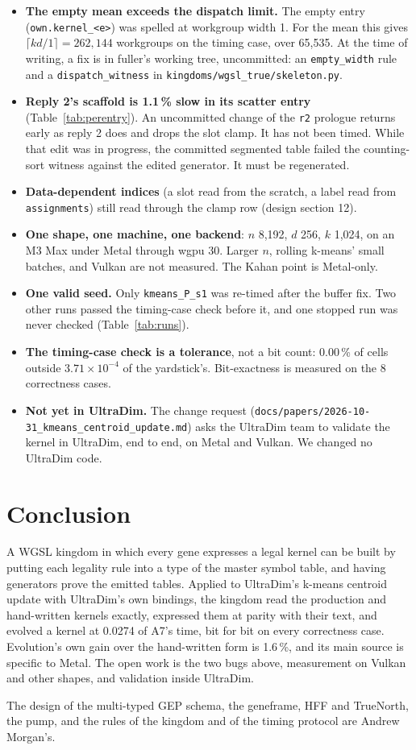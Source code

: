 \documentclass[sigconf,nonacm]{acmart}
\newcommand{\code}[1]{\nolinkurl{#1}}
\newcommand{\src}[1]{{\footnotesize\nolinkurl{#1}}}
\begin{document}
\begin{itemize}
\item \textbf{The empty mean exceeds the dispatch limit.} The empty entry
  (\code{own.kernel_<e>}) was spelled at workgroup width 1. For the mean this
  gives $\lceil kd/1\rceil=262{,}144$ workgroups on the timing case, over
  65,535. At the time of writing, a fix is in fuller's working tree,
  uncommitted: an \code{empty_width} rule and a \code{dispatch_witness} in
  \src{kingdoms/wgsl_true/skeleton.py}.
\item \textbf{Reply 2's scaffold is 1.1\,\% slow in its scatter entry}
  (Table~\ref{tab:perentry}). An uncommitted change of the \code{r2} prologue
  returns early as reply 2 does and drops the slot clamp. It has not been
  timed. While that edit was in progress, the committed segmented table
  failed the counting-sort witness against the edited generator. It must be
  regenerated.
\item \textbf{Data-dependent indices} (a slot read from the scratch, a label
  read from \code{assignments}) still read through the clamp row (design
  section 12).
\item \textbf{One shape, one machine, one backend}: $n$ 8,192, $d$ 256, $k$
  1,024, on an M3 Max under Metal through wgpu 30. Larger $n$, rolling
  k-means' small batches, and Vulkan are not measured. The Kahan point is
  Metal-only.
\item \textbf{One valid seed.} Only \code{kmeans_P_s1} was re-timed after the
  buffer fix. Two other runs passed the timing-case check before it, and one
  stopped run was never checked (Table~\ref{tab:runs}).
\item \textbf{The timing-case check is a tolerance}, not a bit count: 0.00\,\%
  of cells outside $3.71\times10^{-4}$ of the yardstick's. Bit-exactness is
  measured on the 8 correctness cases.
\item \textbf{Not yet in UltraDim.} The change request
  (\src{docs/papers/2026-10-31_kmeans_centroid_update.md}) asks the UltraDim
  team to validate the kernel in UltraDim, end to end, on Metal and Vulkan.
  We changed no UltraDim code.
\end{itemize}

\section{Conclusion}

A WGSL kingdom in which every gene expresses a legal kernel can be built by
putting each legality rule into a type of the master symbol table, and having
generators prove the emitted tables. Applied to UltraDim's k-means centroid
update with UltraDim's own bindings, the kingdom read the production and
hand-written kernels exactly, expressed them at parity with their text, and
evolved a kernel at 0.0274 of A7's time, bit for bit on every correctness case.
Evolution's own gain over the hand-written form is 1.6\,\%, and its main source
is specific to Metal. The open work is the two bugs above, measurement on
Vulkan and other shapes, and validation inside UltraDim.

\begin{acks}
The design of the multi-typed GEP schema, the geneframe, HFF and TrueNorth, the
pump, and the rules of the kingdom and of the timing protocol are Andrew
Morgan's.
\end{acks}



\end{document}

